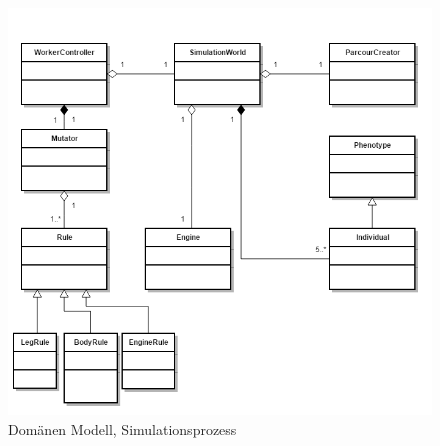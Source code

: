       \begin{figure}[H]
        \includegraphics[scale=0.6]{graphics/simulation_process}
        \caption{Domänen Modell, Simulationsprozess\label{fig:simulationProcess}}
      \end{figure}
